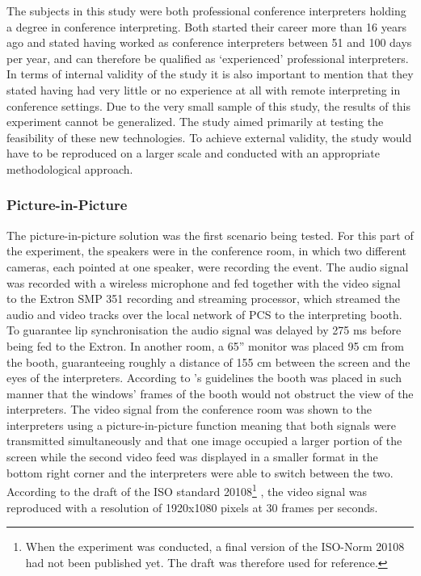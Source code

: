 \documentclass[output=paper]{langsci/langscibook}
\begin{document}
The subjects in this study were both professional conference interpreters holding a degree in conference interpreting. Both started their career more than 16 years ago and stated having worked as conference interpreters between 51 and 100 days per year, and can therefore be qualified as ‘experienced’ professional interpreters. In terms of internal validity of the study it is also important to mention that they stated having had very little or no experience at all with remote interpreting in conference settings. Due to the very small sample of this study, the results of this experiment cannot be generalized. The study aimed primarily at testing the feasibility of these new technologies. To achieve external validity, the study would have to be reproduced on a larger scale and conducted with an appropriate methodological approach.

\subsubsection{Picture-in-Picture} 

The picture-in-picture solution was the first scenario being tested. For this part of the experiment, the speakers were in the conference room, in which two different cameras, each pointed at one speaker, were recording the event. The audio signal was recorded with a wireless microphone and fed together with the video signal to the Extron SMP 351 recording and streaming processor, which streamed the audio and video tracks over the local network of PCS to the interpreting booth. To guarantee lip synchronisation the audio signal was delayed by 275 ms before being fed to the Extron. In another room, a 65” monitor was placed 95 cm from the booth, guaranteeing roughly a distance of 155 cm between the screen and the eyes of the interpreters. According to \citeauthor{Causo2011}’s guidelines \citeyear[2]{Causo2011} the booth was placed in such manner that the windows’ frames of the booth would not obstruct the view of the interpreters. The video signal from the conference room was shown to the interpreters using a picture-in-picture function meaning that both signals were transmitted simultaneously and that one image occupied a larger portion of the screen while the second video feed was displayed in a smaller format in the bottom right corner and the interpreters were able to switch between the two. According to the draft of the \textsc{ISO} standard 20108\footnote{When the experiment was conducted, a final version of the \textsc{ISO}-Norm 20108 had not been published yet. The draft was therefore used for reference.} \citeyear[6]{ISO20108}, the video signal was reproduced with a resolution of 1920x1080 pixels at 30 frames per seconds. 
\end{document}
